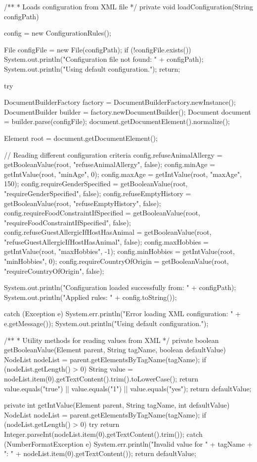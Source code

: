 \documentclass{mytex}
\begin{document}
\begin{codebox}
/**
* Loads configuration from XML file
*/
private void loadConfiguration(String configPath) {
	config = new ConfigurationRules();
	
	File configFile = new File(configPath);
	if (!configFile.exists()) {
		System.out.println("Configuration file not found: " + configPath);
		System.out.println("Using default configuration.");
		return;
	}
	
	try {
		DocumentBuilderFactory factory = DocumentBuilderFactory.newInstance();
		DocumentBuilder builder = factory.newDocumentBuilder();
		Document document = builder.parse(configFile);
		document.getDocumentElement().normalize();
		
		Element root = document.getDocumentElement();
		
		// Reading different configuration criteria
		config.refuseAnimalAllergy = getBooleanValue(root, "refuseAnimalAllergy", false);
		config.minAge = getIntValue(root, "minAge", 0);
		config.maxAge = getIntValue(root, "maxAge", 150);
		config.requireGenderSpecified = getBooleanValue(root, "requireGenderSpecified", false);
		config.refuseEmptyHistory = getBooleanValue(root, "refuseEmptyHistory", false);
		config.requireFoodConstraintIfSpecified = getBooleanValue(root, "requireFoodConstraintIfSpecified", false);
		config.refuseGuestAllergicIfHostHasAnimal = getBooleanValue(root, "refuseGuestAllergicIfHostHasAnimal", false);
		config.maxHobbies = getIntValue(root, "maxHobbies", -1);
		config.minHobbies = getIntValue(root, "minHobbies", 0);
		config.requireCountryOfOrigin = getBooleanValue(root, "requireCountryOfOrigin", false);
		
		System.out.println("Configuration loaded successfully from: " + configPath);
		System.out.println("Applied rules: " + config.toString());
		
	} catch (Exception e) {
		System.err.println("Error loading XML configuration: " + e.getMessage());
		System.out.println("Using default configuration.");
	}
}

\end{codebox}

\begin{codebox}
/**
* Utility methods for reading values from XML
*/
private boolean getBooleanValue(Element parent, String tagName, boolean defaultValue) {
	NodeList nodeList = parent.getElementsByTagName(tagName);
	if (nodeList.getLength() > 0) {
		String value = nodeList.item(0).getTextContent().trim().toLowerCase();
		return value.equals("true") || value.equals("1") || value.equals("yes");
	}
	return defaultValue;
}

private int getIntValue(Element parent, String tagName, int defaultValue) {
	NodeList nodeList = parent.getElementsByTagName(tagName);
	if (nodeList.getLength() > 0) {
		try {
			return Integer.parseInt(nodeList.item(0).getTextContent().trim());
		} catch (NumberFormatException e) {
			System.err.println("Invalid value for " + tagName + ": " + nodeList.item(0).getTextContent());
		}
	}
	return defaultValue;
}
\end{codebox}
\end{document}
